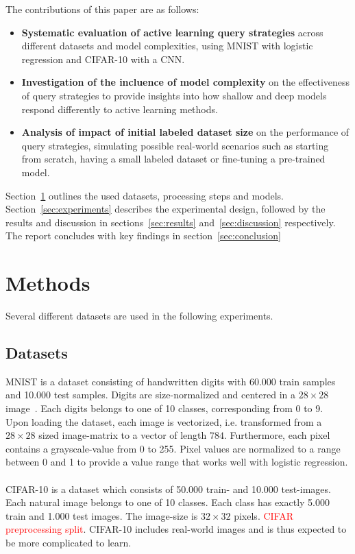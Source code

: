 \documentclass{article}
\theoremstyle{plain}
\theoremstyle{definition}
\theoremstyle{remark}
\begin{document}
The contributions of this paper are as follows:
\begin{itemize}
	\item \textbf{Systematic evaluation of active learning query strategies} across different datasets and model complexities, using MNIST with logistic regression and CIFAR-10 with a CNN.
	\item \textbf{Investigation of the incluence of model complexity} on the effectiveness of query strategies to provide insights into how shallow and deep models respond differently to active learning methods.
	\item \textbf{Analysis of impact of initial labeled dataset size} on the performance of query strategies, simulating possible real-world scenarios such as starting from scratch, having a small labeled dataset or fine-tuning a pre-trained model.
\end{itemize}
Section~\ref{sec:methods} outlines the used datasets, processing steps and models. Section~\ref{sec:experiments} describes the experimental design, followed by the results and discussion in sections~\ref{sec:results} and~\ref{sec:discussion} respectively. The report concludes with key findings in section~\ref{sec:conclusion}

\section{Methods}\label{sec:methods}
Several different datasets are used in the following experiments.
\subsection{Datasets}
MNIST is a dataset consisting of handwritten digits with 60.000 train samples and 10.000 test samples. Digits are size-normalized and centered in a $28 \times 28$ image~\cite{mnist}. Each digits belongs to one of 10 classes, corresponding from 0 to 9. \\
Upon loading the dataset, each image is vectorized, i.e. transformed from a $28 \times 28$ sized image-matrix to a vector of length $784$. Furthermore, each pixel contains a grayscale-value from 0 to 255. Pixel values are normalized to a range between 0 and 1 to provide a value range that works well with logistic regression.
\\
\\
CIFAR-10 is a dataset which consists of 50.000 train- and 10.000 test-images. Each natural image belongs to one of 10 classes. Each class has exactly 5.000 train and 1.000 test images. The image-size is $32 \times 32$ pixels. 
\textcolor{red}{CIFAR preprocessing split}. CIFAR-10 includes real-world images and is thus expected to be more complicated to learn.
\end{document}
